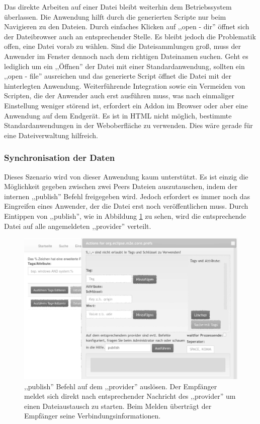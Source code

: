 \documentclass[oneside, ngerman, toc=bibliography,bibliography=totoc,listof=entryprefix, open=right,numbers=noenddot,fontsize=12pt]{scrbook}
\begin{document}
Das direkte Arbeiten auf einer Datei bleibt weiterhin dem Betriebssystem überlassen. Die Anwendung hilft durch die generierten Scripte nur beim Navigieren zu den Dateien. Durch einfaches Klicken auf ,,open - dir'' öffnet sich der Dateibrowser auch an entsprechender Stelle. Es bleibt jedoch die Problematik offen, eine Datei vorab zu wählen. Sind die Dateisammlungen groß, muss der Anwender im Fenster dennoch nach dem richtigen Dateinamen suchen. Geht es lediglich um ein ,,Öffnen'' der Datei mit einer Standardanwendung, sollten ein ,,open - file'' ausreichen und das generierte Script öffnet die Datei mit der hinterlegten Anwendung.
Weiterführende Integration sowie ein Vermeiden von Scripten, die der Anwender auch erst ausführen muss, was nach einmaliger Einstellung weniger störend ist, erfordert ein Addon im Browser oder aber eine Anwendung auf dem Endgerät. Es ist in HTML nicht möglich, bestimmte Standardanwendungen in der Weboberfläche zu verwenden. Dies wäre gerade für eine Dateiverwaltung hilfreich.

 
\subsubsection{Synchronisation der Daten}
Dieses Szenario wird von dieser Anwendung kaum unterstützt. Es ist einzig die Möglichkeit gegeben zwischen zwei Peers Dateien auszutauschen, indem der internen ,,publish'' Befehl freigegeben wird. Jedoch erfordert es immer noch das Eingreifen eines Anwender, der die Datei erst noch veröffentlichen muss. Durch Eintippen von ,,publish'', wie in Abbildung \ref{fig:www-cmd-pub} zu sehen, wird die entsprechende Datei auf alle angemeldeten ,,provider'' verteilt.

\begin{figure}[htbp] 
    \centering
    \includegraphics[width=\textwidth]{Masterarbeit_Bilder/www_cmd_publish.png}
    \caption{ ,,publish'' Befehl auf dem ,,provider'' auslösen. Der Empfänger meldet sich direkt nach entsprechender Nachricht des  ,,provider'' um einen Dateiaustausch zu starten. Beim Melden überträgt der Empfänger seine Verbindungsinformationen.}
    \label{fig:www-cmd-pub}
\end{figure}  
\end{document}
